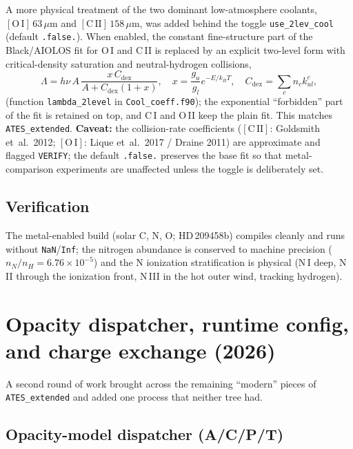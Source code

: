 \documentclass[english,a4paper]{kiseon_memo}
\begin{document}
A more physical treatment of the two dominant low-atmosphere coolants,
\([\mathrm{O\,I}]\,63\,\mu\)m and \([\mathrm{C\,II}]\,158\,\mu\)m, was
added behind the toggle \texttt{use\_2lev\_cool} (default
\texttt{.false.}).  When enabled, the constant fine-structure part of
the Black/AIOLOS fit for O\,I and C\,II is replaced by an explicit
two-level form with critical-density saturation and neutral-hydrogen
collisions,
\[
  \Lambda = h\nu\,A\,\frac{x\,C_{\mathrm{dex}}}
                          {A + C_{\mathrm{dex}}(1+x)},
  \quad x = \frac{g_u}{g_l}e^{-E/k_BT},
  \quad C_{\mathrm{dex}} = \sum_c n_c k_{ul}^{c},
\]
(function \texttt{lambda\_2level} in \texttt{Cool\_coeff.f90}); the
exponential ``forbidden'' part of the fit is retained on top, and C\,I
and O\,II keep the plain fit.  This matches \texttt{ATES\_extended}.
\textbf{Caveat:} the collision-rate coefficients
(\([\mathrm{C\,II}]\): Goldsmith et~al.~2012; \([\mathrm{O\,I}]\):
Lique et~al.~2017 / Draine 2011) are approximate and flagged
\texttt{VERIFY}; the default \texttt{.false.} preserves the base fit so
that metal-comparison experiments are unaffected unless the toggle is
deliberately set.

\subsection{Verification}

The metal-enabled build (solar C, N, O; HD\,209458b) compiles cleanly
and runs without \texttt{NaN}/\texttt{Inf}; the nitrogen abundance is
conserved to machine precision (\(n_N/n_H = 6.76\times10^{-5}\)) and the
N ionization stratification is physical (N\,I deep, N\,II through the
ionization front, N\,III in the hot outer wind, tracking hydrogen).

\section{Opacity dispatcher, runtime config, and charge exchange (2026)}
\label{sec:catchup}

A second round of work brought across the remaining ``modern'' pieces of
\texttt{ATES\_extended} and added one process that neither tree had.

\subsection{Opacity-model dispatcher (A/C/P/T)}
\end{document}
